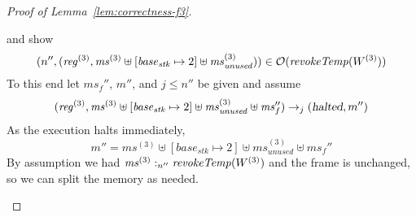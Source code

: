 \documentclass[a4paper]{article}
\newcommand{\var}[1]{\mathit{#1}}
\newcommand{\hs}{\var{ms}}
\newcommand{\ms}{\hs}
\newcommand{\start}{\var{base}}
\newcommand{\reg}{\var{reg}}
\newcommand{\heap}{\var{mem}}
\newcommand{\stk}{\var{stk}}
\newcommand{\halted}{\textsl{halted}}
\newcommand{\plainfun}[2]{
  \ifthenelse{\equal{#2}{}}
  {\mathit{#1}}
  {\mathit{#1}(#2)}
}
\newcommand{\revokeTemp}[1]{\plainfun{revokeTemp}{#1}}
\newcommand{\heapSat}[3][\heap]{#1 :_{#2} #3}
\newcommand{\memSat}[3][n]{\heapSat[#2]{#1}{#3}}
\newcommand{\observations}{\mathcal{O}}
\newcommand{\step}[1][]{\rightarrow_{#1}}
\begin{document}
\begin{proof}[Proof of Lemma~\ref{lem:correctness-f3}]
\begin{enumproof}
\begin{enumproof}
\begin{enumproof}
\begin{enumproof}
\begin{itemize}
            \end{itemize}
            and show
            \[
              (n'', (\reg^{(3)},\ms^{(3)} \uplus [\start_\stk \mapsto 2] \uplus \ms_{\var{unused}}^{(3)})) \in \observations(\revokeTemp{W^{(3)}})
            \]
            To this end let $\ms_f''$, $m''$, and $j \leq n''$ be given and assume
            \[
              (\reg^{(3)},\ms^{(3)} \uplus [\start_\stk \mapsto 2] \uplus \ms_{\var{unused}}^{(3)} \uplus \ms_f'') \step[j] (\halted,m'')
            \]
            As the execution halts immediately, 
            \[
              m'' = \ms^{(3)} \uplus [\start_\stk \mapsto 2] \uplus \ms_{\var{unused}}^{(3)} \uplus \ms_f''
            \]
            By assumption we had $\memSat[n'']{\ms^{(3)}}{\revokeTemp{W^{(3)}}}$ and the frame is unchanged, so we can split the memory as needed.
        \end{enumproof}
      \end{enumproof}
    \end{enumproof}
  \end{enumproof}
\end{proof}
\end{document}
